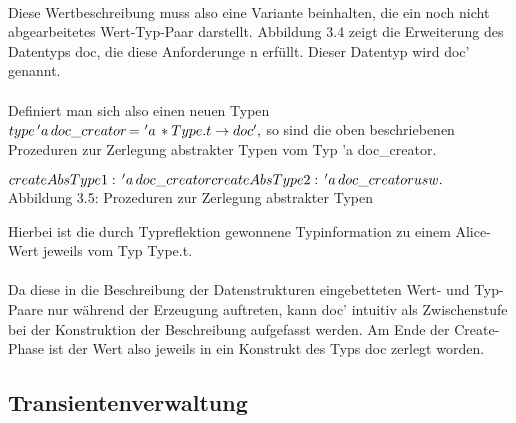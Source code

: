 \documentclass[12pt,a4paper]{article}
\begin{document}
\paragraph{}

Diese Wertbeschreibung muss also eine Variante 
beinhalten, die ein noch nicht abgearbeitetes 
Wert-Typ-Paar darstellt. Abbildung 3.4 zeigt die 
Erweiterung des Datentyps doc, die diese 
Anforderunge n erf\"ullt. Dieser Datentyp 
wird doc' genannt.

\paragraph{}

Definiert man sich also einen neuen Typen \newline
\begin{math}
type \, 'a \, doc\_creator \, $=$ \, \,'a \, * Type.t \rightarrow doc',
\end{math} \newline
so sind die oben beschriebenen Prozeduren zur 
Zerlegung abstrakter Typen vom Typ 'a doc\_creator. 
\begin{center}
\begin{math}
createAbsType1: \, 'a \, doc\_creator \newline
createAbsType2: \, 'a \, doc\_creator \newline 
usw. \newline
\end{math} \newline
Abbildung 3.5: Prozeduren zur Zerlegung abstrakter Typen
\end{center}
Hierbei ist die durch Typreflektion gewonnene Typinformation 
zu einem Alice-Wert jeweils vom Typ Type.t.
 
\paragraph{}

Da diese in die Beschreibung der Datenstrukturen   
eingebetteten Wert- und Typ-Paare nur w\"ahrend der Erzeugung 
auftreten, kann doc' intuitiv als Zwischenstufe bei der 
Konstruktion der Beschreibung aufgefasst werden. Am Ende der 
Create-Phase ist der Wert also jeweils in ein Konstrukt des Typs doc
zerlegt worden.

\subsection{Transientenverwaltung}
\end{document}
